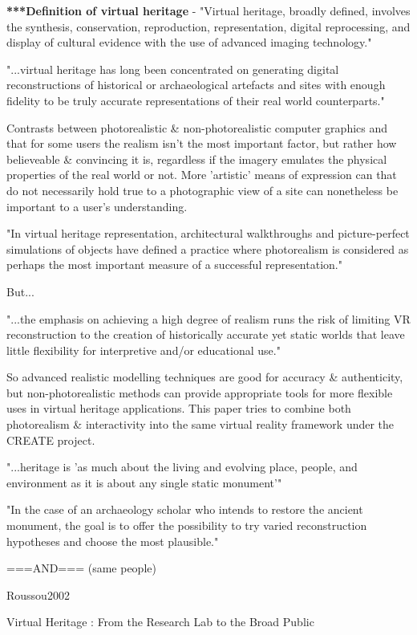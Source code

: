 \textbf{***Definition of virtual heritage} - "Virtual heritage, broadly defined, involves the synthesis, conservation,
reproduction, representation, digital reprocessing, and display of cultural evidence with the use of
advanced imaging technology."
        
"...virtual heritage has long been concentrated on generating digital reconstructions of historical or
archaeological artefacts and sites with enough fidelity to be truly accurate representations of their real
world counterparts."
        
Contrasts between photorealistic & non-photorealistic computer graphics and that for some users the realism
isn't the most important factor, but rather how believeable & convincing it is, regardless if the imagery
emulates the physical properties of the real world or not. More 'artistic' means of expression can that do
not necessarily hold true to a photographic view of a site can nonetheless be important to a user's understanding.
        
"In virtual heritage representation, architectural walkthroughs and picture-perfect simulations of objects
have defined a practice where photorealism is considered as perhaps the most important measure of a
successful representation."
        
But...
        
"...the emphasis on achieving a high degree of realism runs the risk of limiting VR reconstruction to the
creation of historically accurate yet static worlds that leave little flexibility for interpretive and/or
educational use."
        
So advanced realistic modelling techniques are good for accuracy & authenticity, but non-photorealistic methods
can provide appropriate tools for more flexible uses in virtual heritage applications. This paper tries to
combine both photorealism & interactivity into the same virtual reality framework under the CREATE project.
        
"...heritage is 'as much about the living and evolving place, people, and environment as it is about any
single static monument'"
        
"In the case of an archaeology scholar who intends to restore the ancient monument, the goal is to offer
the possibility to try varied reconstruction hypotheses and choose the most plausible."

===AND=== (same people)

Roussou2002

Virtual Heritage : From the Research Lab to the Broad Public

